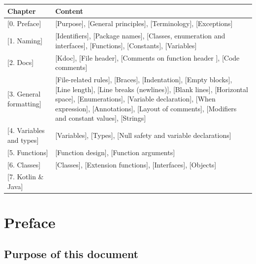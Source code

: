 \begin{center}

\begin{tabular}{ |p{}|p{}| }

\hline

Chapter&Content\\

\hline

 [0. Preface] & [Purpose], [General principles], [Terminology], [Exceptions] \\

 [1. Naming]    & [Identifiers], [Package names], [Classes, enumeration and interfaces], [Functions], [Constants], [Variables] \\

 [2. Docs]  & [Kdoc], [File header], [Comments on function header ], [Code comments] \\

 [3. General formatting]   & [File-related rules], [Braces], [Indentation], [Empty blocks], [Line length], [Line breaks (newlines)], [Blank lines], [Horizontal space], [Enumerations], [Variable declaration], [When expression], [Annotations], [Layout of comments], [Modifiers and constant values], [Strings]\\

 [4. Variables and types] & [Variables], [Types], [Null safety and variable declarations]\\

 [5. Functions] & [Function design], [Function arguments]\\

 [6. Classes] & [Classes], [Extension functions], [Interfaces], [Objects] \\

 [7. Kotlin \& Java] &  \\

\hline

\end{tabular}

\end{center}





\section*{\textbf{Preface}}

\subsection*{\textbf{Purpose of this document}}



